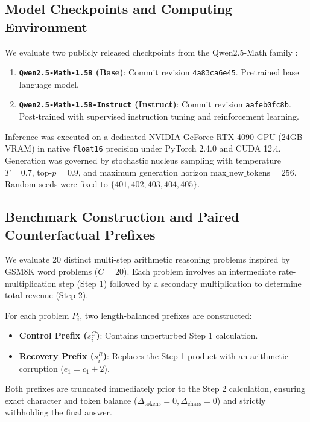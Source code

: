 \documentclass[11pt,letterpaper]{article}
\newcommand{\modelbase}{\texttt{Qwen2.5-Math-1.5B}}
\newcommand{\modelinstruct}{\texttt{Qwen2.5-Math-1.5B-Instruct}}
\begin{document}
\subsection{Model Checkpoints and Computing Environment}
We evaluate two publicly released checkpoints from the Qwen2.5-Math family \cite{qwen25math2024}:
\begin{enumerate}
    \item \textbf{\modelbase{} (Base)}: Commit revision \texttt{4a83ca6e45}. Pretrained base language model.
    \item \textbf{\modelinstruct{} (Instruct)}: Commit revision \texttt{aafeb0fc8b}. Post-trained with supervised instruction tuning and reinforcement learning.
\end{enumerate}
Inference was executed on a dedicated NVIDIA GeForce RTX 4090 GPU (24GB VRAM) in native \texttt{float16} precision under PyTorch 2.4.0 and CUDA 12.4. Generation was governed by stochastic nucleus sampling with temperature $T=0.7$, top-$p=0.9$, and maximum generation horizon $\text{max\_new\_tokens}=256$. Random seeds were fixed to $\{401, 402, 403, 404, 405\}$.

\subsection{Benchmark Construction and Paired Counterfactual Prefixes}
We evaluate 20 distinct multi-step arithmetic reasoning problems inspired by GSM8K word problems ($C=20$). Each problem involves an intermediate rate-multiplication step (Step 1) followed by a secondary multiplication to determine total revenue (Step 2). 

For each problem $P_i$, two length-balanced prefixes are constructed:
\begin{itemize}
    \item \textbf{Control Prefix ($s_{i}^{C}$)}: Contains unperturbed Step 1 calculation.
    \item \textbf{Recovery Prefix ($s_{i}^{R}$)}: Replaces the Step 1 product with an arithmetic corruption ($e_1 = c_1 + 2$).
\end{itemize}
Both prefixes are truncated immediately prior to the Step 2 calculation, ensuring exact character and token balance ($\Delta_{\text{tokens}} = 0, \Delta_{\text{chars}} = 0$) and strictly withholding the final answer.
\end{document}

